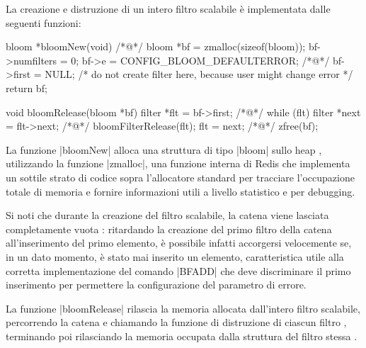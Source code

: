 La creazione e distruzione di un intero filtro scalabile è implementata dalle seguenti funzioni:

\begin{commentedsource}[style=csource,caption=Creazione e distruzione di un filtro scalabile]
bloom *bloomNew(void) {
/*@\lnote@*/	bloom *bf = zmalloc(sizeof(bloom));
	bf->numfilters = 0; 
    bf->e = CONFIG_BLOOM_DEFAULTERROR;
/*@\lnote@*/    bf->first = NULL; /* do not create filter here, because user might change error */ 
	return bf;
}

void bloomRelease(bloom *bf) {
    filter *flt = bf->first;
/*@\lnote@*/    while (flt) { 
        filter *next = flt->next;
/*@\lnote@*/        bloomFilterRelease(flt); 
        flt = next;
    }
/*@\lnote@*/    zfree(bf); 
}
\end{commentedsource}

La funzione \cverb|bloomNew| alloca una struttura di tipo \cverb|bloom| sullo heap ,
utilizzando la funzione \cverb|zmalloc|, una funzione interna di Redis che implementa un sottile
strato di codice sopra l'allocatore standard per tracciare l'occupazione totale di memoria e fornire
informazioni utili a livello statistico e per debugging.

Si noti che durante la creazione del filtro scalabile, la catena viene lasciata completamente vuota
: ritardando la creazione del primo filtro della catena all'inserimento del primo elemento,
è possibile infatti accorgersi velocemente se, in un dato momento, è stato mai inserito un elemento,
caratteristica utile alla corretta implementazione del comando \cverb|BFADD| che deve discriminare il
primo inserimento per permettere la configurazione del parametro di errore.

La funzione \cverb|bloomRelease| rilascia la memoria allocata dall'intero filtro scalabile,
percorrendo la catena  e chiamando la funzione di distruzione di ciascun filtro ,
terminando poi rilasciando la memoria occupata dalla struttura del filtro stessa .

